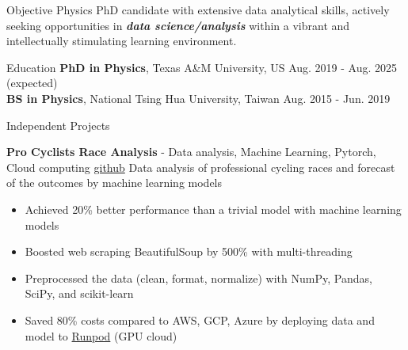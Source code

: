 \documentclass{resume}
\begin{document}
\vspace{-2.75em}
\begin{rSection}{Objective}
    Physics PhD candidate with extensive data analytical skills,
    actively seeking opportunities in \textbf{\textit{data science/analysis}} within a vibrant and intellectually stimulating learning environment.
\end{rSection}

\vspace{-0.5em}
\begin{rSection}{Education}
\vspace{-0.25em}
{\bf PhD in Physics}, Texas A\&M University, US \hfill {Aug. 2019 - Aug. 2025 (expected)} \\
{\bf BS in Physics}, National Tsing Hua University, Taiwan \hfill {Aug. 2015 - Jun. 2019}
\end{rSection}


\begin{rSection}{Independent Projects}
    \vspace{-1.5em}
    \item \textbf{Pro Cyclists Race Analysis} - {Data analysis, Machine Learning, Pytorch, Cloud computing} \hfill {\href{https://github.com/noctildon/pro_cyclists}{github}} \newline
    \hspace*{0.5em} {\normalsize Data analysis of professional cycling races and forecast of the outcomes by machine learning models}
    \begin{itemize}
        \itemsep -3pt {}
        \item Achieved 20\% better performance than a trivial model with machine learning models
        \item Boosted web scraping BeautifulSoup by 500\% with multi-threading
        \item Preprocessed the data (clean, format, normalize) with NumPy, Pandas, SciPy, and scikit-learn
        \item Saved 80\% costs compared to AWS, GCP, Azure by deploying data and model to \href{https://www.runpod.io/}{Runpod} (GPU cloud)
    \end{itemize}
\end{rSection}
\end{document}

